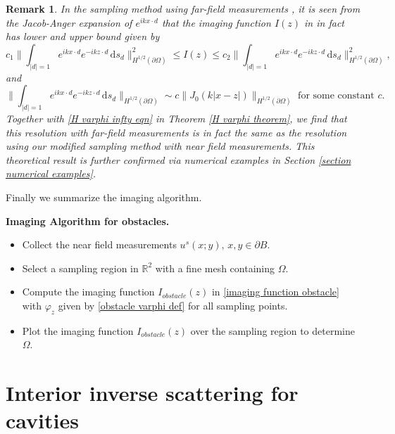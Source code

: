 \documentclass[final]{siamltex}
\newtheorem{remark}{Remark}
\newcommand{\ind}{\,\mbox{d}}
\begin{document}
\begin{remark}
In the sampling method using far-field measurements \cite{LiuIP17}, it is seen from the Jacob-Anger expansion of $e^{ik x\cdot d}$ that the imaging function $I(z)$ in \cite{LiuIP17} in fact has lower and upper bound given by
$$
c_1 \Big\| \int_{|d|=1} e^{ik x\cdot d} e^{-ik z\cdot d}  \ind s_d \Big\|^2_{H^{1/2}(\partial \Omega)} \le I(z) \le c_2 \Big\| \int_{|d|=1} e^{ik x\cdot d} e^{-ik z\cdot d}  \ind s_d \Big\|^2_{H^{1/2}(\partial \Omega)},
$$
and
$$
\Big\| \int_{|d|=1} e^{ik x\cdot d} e^{-ik z\cdot d}  \ind s_d \Big\|_{H^{1/2}(\partial \Omega)} \sim c\Big\|J_0(k|x-z|) \Big\|_{H^{1/2}(\partial \Omega)} \mbox{ for some constant } c.
$$
Together with \eqref{H varphi infty eqn} in Theorem \ref{H varphi theorem}, we find that this resolution with far-field measurements is in fact the same as the resolution using our modified sampling method with near field measurements. This theoretical result is further confirmed via numerical examples in Section \ref{section numerical examples}.
\end{remark}

Finally we summarize the imaging algorithm.

\vspace{0.5\baselineskip}

\noindent\textbf{Imaging Algorithm for obstacles.}
\
\begin{itemize}
\item Collect the  near field measurements $u^s(x;y), \,x,y \in \partial B$.
\item Select a sampling region in $\mathbb{R}^2$ with a fine mesh containing $\Omega$.
\item Compute the imaging function $I_{obstacle}(z)$ in \eqref{imaging function obstacle} with $\varphi_z$ given by \eqref{obstacle varphi def}  for all sampling points.
\item Plot the imaging function $I_{obstacle}(z)$ over the sampling region to determine $\Omega$.
\end{itemize}


\section{Interior inverse scattering for cavities} \label{section cavity}
\end{document}
